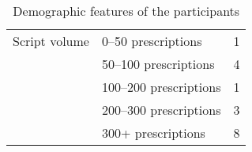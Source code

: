\begin{table}[htb]
\begin{tabular}{llc}
Script volume     & 0--50 prescriptions                                                                                                            & 1  \\
                  & 50--100 prescriptions                                                                                                          & 4  \\
                  & 100--200 prescriptions                                                                                                         & 1  \\
                  & 200--300 prescriptions                                                                                                         & 3  \\
                  & 300+ prescriptions                                                                                                             & 8\B\\
\hline
\end{tabular}
\caption{Demographic features of the participants}
\end{table}